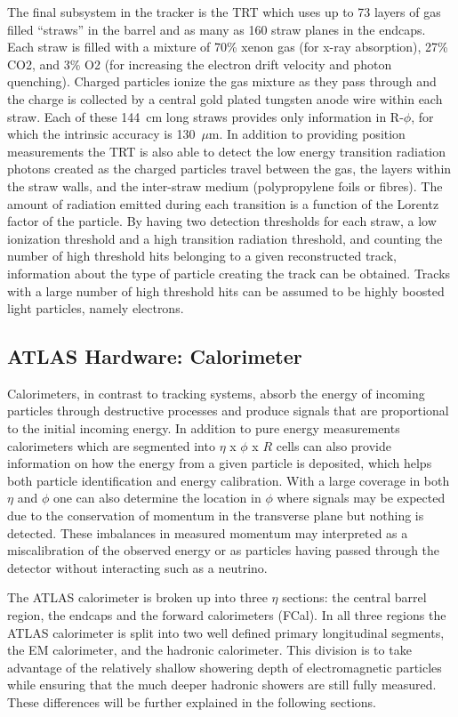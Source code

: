 The final subsystem in the tracker is the TRT which uses up to 73 layers of gas filled ``straws'' in the barrel and as many as 160 straw planes in the endcaps.  
Each straw is filled with a mixture of 70\% xenon gas (for x-ray absorption), 27\% CO2, and 3\% O2 (for increasing the electron drift velocity and photon quenching).  
Charged particles ionize the gas mixture as they pass through and the charge is collected by a central gold plated tungsten anode wire within each straw.  
Each of these 144~cm long straws provides only information in R-$\phi$, for which the intrinsic accuracy is 130~$\mu$m.  
In addition to providing position measurements the TRT is also able to detect the low energy transition radiation photons created as the charged particles travel between the gas, the layers within the straw walls, and the inter-straw medium (polypropylene foils or fibres).  
The amount of radiation emitted during each transition is a function of the Lorentz factor of the particle.  
By having two detection thresholds for each straw, a low ionization threshold and a high transition radiation threshold, and counting the number of high threshold hits belonging to a given reconstructed track, information about the type of particle creating the track can be obtained.  
Tracks with a large number of high threshold hits can be assumed to be highly boosted light particles, namely electrons.  

\subsection{ATLAS Hardware: Calorimeter}
Calorimeters, in contrast to tracking systems, absorb the energy of incoming particles through destructive processes and produce signals that are proportional to the initial incoming energy.  
In addition to pure energy measurements calorimeters which are segmented into $\eta$ x $\phi$ x $R$ cells can also provide information on how the energy from a given particle is deposited, which helps both particle identification and energy calibration.  
With a large coverage in both $\eta$ and $\phi$ one can also determine the location in $\phi$ where signals may be expected due to the conservation of momentum in the transverse plane but nothing is detected.  
These imbalances in measured momentum may interpreted as a miscalibration of the observed energy or as particles having passed through the detector without interacting such as a neutrino.

The ATLAS calorimeter is broken up into three $\eta$ sections: the central barrel region, the endcaps and the forward calorimeters (FCal).  
In all three regions the ATLAS calorimeter is split into two well defined primary longitudinal segments, the \gls{EM} calorimeter, and the hadronic calorimeter.   
This division is to take advantage of the relatively shallow showering depth of electromagnetic particles while ensuring that the much deeper hadronic showers are still fully measured.  
These differences will be further explained in the following sections.  

